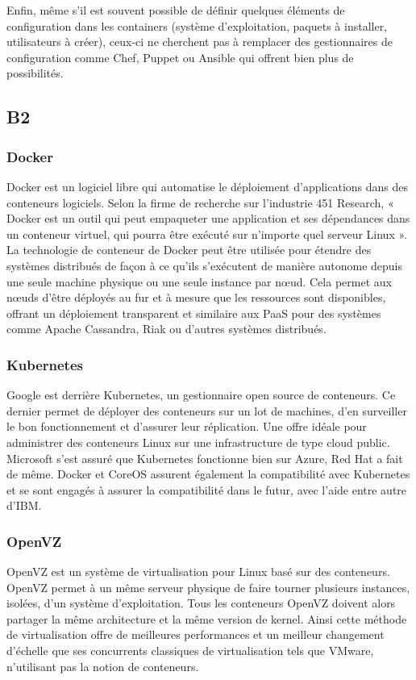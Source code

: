         Enfin, même s'il est souvent possible de définir quelques éléments de configuration dans les containers (système d'exploitation, paquets à installer, utilisateurs à créer), ceux-ci ne cherchent pas à remplacer des gestionnaires de configuration comme Chef, Puppet ou Ansible qui offrent bien plus de possibilités.

\subsection{B2}

    \subsubsection{Docker}
    Docker est un logiciel libre qui automatise le déploiement d'applications dans des conteneurs logiciels. Selon la firme de recherche sur l'industrie 451 Research, « Docker est un outil qui peut empaqueter une application et ses dépendances dans un conteneur virtuel, qui pourra être exécuté sur n'importe quel serveur Linux ».\\

    La technologie de conteneur de Docker peut être utilisée pour étendre des systèmes distribués de façon à ce qu'ils s'exécutent de manière autonome depuis une seule machine physique ou une seule instance par nœud. Cela permet aux nœuds d'être déployés au fur et à mesure que les ressources sont disponibles, offrant un déploiement transparent et similaire aux PaaS pour des systèmes comme Apache Cassandra, Riak ou d'autres systèmes distribués.

    \subsubsection{Kubernetes}
    Google est derrière Kubernetes, un gestionnaire open source de conteneurs. Ce dernier permet de déployer des conteneurs sur un lot de machines, d’en surveiller le bon fonctionnement et d’assurer leur réplication. Une offre idéale pour administrer des conteneurs Linux sur une infrastructure de type cloud public. Microsoft s'est assuré que Kubernetes fonctionne bien sur Azure, Red Hat a fait de même. Docker et CoreOS assurent également la compatibilité avec Kubernetes et se sont engagés à assurer la compatibilité dans le futur, avec l'aide entre autre d'IBM.

    \subsubsection{OpenVZ}
    OpenVZ est un système de virtualisation pour Linux basé sur des conteneurs. OpenVZ permet à un même serveur physique de faire tourner plusieurs instances, isolées, d'un système d'exploitation. Tous les conteneurs OpenVZ doivent alors partager la même architecture et la même version de kernel. Ainsi cette méthode de virtualisation offre de meilleures performances et un meilleur changement d'échelle que ses concurrents classiques de virtualisation tels que VMware, n'utilisant pas la notion de conteneurs.

